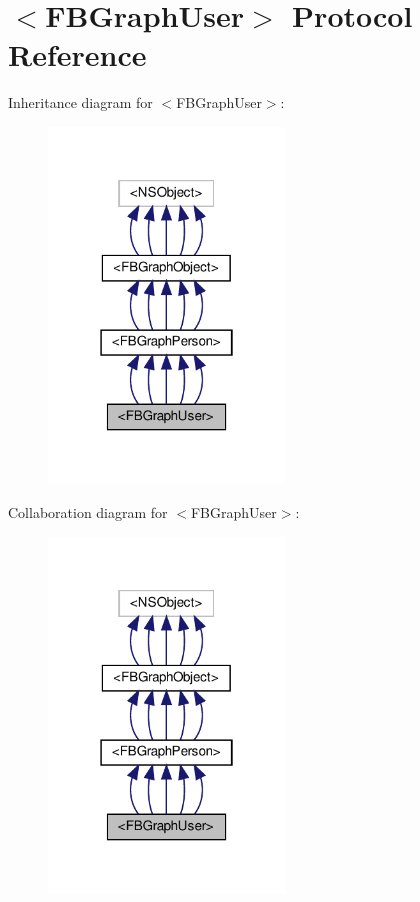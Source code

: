 \hypertarget{protocolFBGraphUser-p}{}\section{$<$F\+B\+Graph\+User$>$ Protocol Reference}
\label{protocolFBGraphUser-p}


Inheritance diagram for $<$F\+B\+Graph\+User$>$\+:
\nopagebreak
\begin{figure}[H]
\begin{center}
\leavevmode
\includegraphics[width=178pt]{protocolFBGraphUser-p__inherit__graph}
\end{center}
\end{figure}


Collaboration diagram for $<$F\+B\+Graph\+User$>$\+:
\nopagebreak
\begin{figure}[H]
\begin{center}
\leavevmode
\includegraphics[width=178pt]{protocolFBGraphUser-p__coll__graph}
\end{center}
\end{figure}
